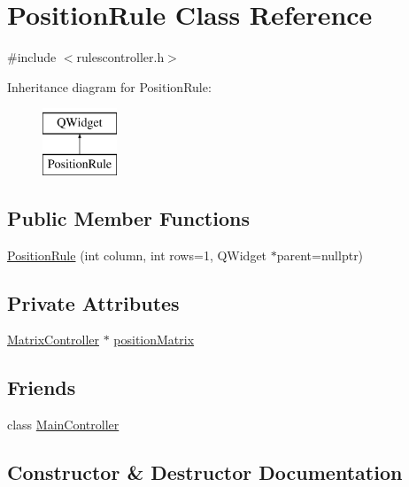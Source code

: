 \hypertarget{class_position_rule}{}\section{Position\+Rule Class Reference}
\label{class_position_rule}


{\ttfamily \#include $<$rulescontroller.\+h$>$}

Inheritance diagram for Position\+Rule\+:\begin{figure}[H]
\begin{center}
\leavevmode
\includegraphics[height=2.000000cm]{class_position_rule}
\end{center}
\end{figure}
\subsection*{Public Member Functions}
\begin{DoxyCompactItemize}
\item 
\mbox{\hyperlink{class_position_rule_a5db88bbd487ea356486bf5e3183f3c81}{Position\+Rule}} (int column, int rows=1, Q\+Widget $\ast$parent=nullptr)
\end{DoxyCompactItemize}
\subsection*{Private Attributes}
\begin{DoxyCompactItemize}
\item 
\mbox{\hyperlink{class_matrix_controller}{Matrix\+Controller}} $\ast$ \mbox{\hyperlink{class_position_rule_a1b8c45dd4a95666a2f1826a063fba837}{position\+Matrix}}
\end{DoxyCompactItemize}
\subsection*{Friends}
\begin{DoxyCompactItemize}
\item 
class \mbox{\hyperlink{class_position_rule_a154f5ffe46dc74c6c94311b4cc3927ae}{Main\+Controller}}
\end{DoxyCompactItemize}


\subsection{Constructor \& Destructor Documentation}
\mbox{\label{class_position_rule_a5db88bbd487ea356486bf5e3183f3c81}} 
